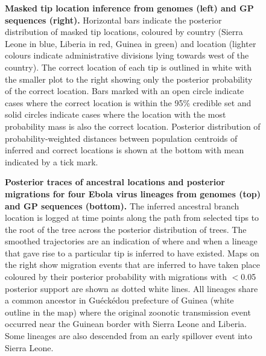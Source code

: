 \documentclass{bmcart}
\def\texttt{[image: ]}
\begin{document}
\begin{backmatter}
\begin{figure}[h]
 \centering
	\caption{\textbf{Masked tip location inference from genomes (left) and GP sequences (right).}
  Horizontal bars indicate the posterior distribution of masked tip locations, coloured by country (Sierra Leone in blue, Liberia in red, Guinea in green) and location (lighter colours indicate administrative divisions lying towards west of the country).
  The correct location of each tip is outlined in white with the smaller plot to the right showing only the posterior probability of the correct location.
  Bars marked with an open circle indicate cases where the correct location is within the 95\% credible set and solid circles indicate cases where the location with the most probability mass is also the correct location.
  Posterior distribution of probability-weighted distances between population centroids of inferred and correct locations is shown at the bottom with mean indicated by a tick mark.
	}
	\label{locations}
\end{figure}

\begin{figure}[h]
 \centering
  \caption{\textbf{Posterior traces of ancestral locations and posterior migrations for four Ebola virus lineages from genomes (top) and GP sequences (bottom).}
  The inferred ancestral branch location is logged at time points along the path from selected tips to the root of the tree across the posterior distribution of trees.
  The smoothed trajectories are an indication of where and when a lineage that gave rise to a particular tip is inferred to have existed.
  Maps on the right show migration events that are inferred to have taken place coloured by their posterior probability with migrations with $<$0.05 posterior support are shown as dotted white lines.
  All lineages share a common ancestor in Gu\'{e}ck\'{e}dou prefecture of Guinea (white outline in the map) where the original zoonotic transmission event occurred near the Guinean border with Sierra Leone and Liberia.
  Some lineages are also descended from an early spillover event into Sierra Leone.
  }
	\label{trace}
\end{figure}




\end{backmatter}
\end{document}

